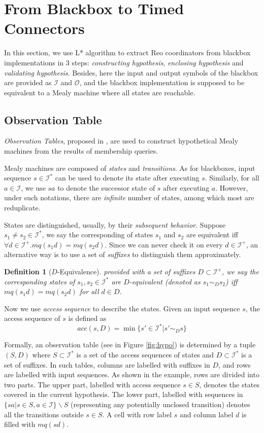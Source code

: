\documentclass[conference, a4paper]{IEEEtran}
\newtheorem{definition}{Definition}
\begin{document}
\section{From Blackbox to Timed Connectors} 
\label{sec:activelearning}
In this section, we use L* algorithm to extract Reo coordinators from blackbox
implementations in 3 steps:
\emph{constructing hypothesis}, \emph{enclosing hypothesis} and \emph{validating hypothesis}. Besides,
here the input and output symbols of the blackbox are provided as $\mathcal{I}$ and $\mathcal{O}$,
and the blackbox implementation is supposed to be equivalent to a Mealy machine where all states are
reachable.

\subsection{Observation Table}
\emph{Observation Tables}, proposed in \cite{DBLP:journals/iandc/Angluin87}, are used to construct
hypothetical Mealy machines from the results of membership queries.

Mealy machines are composed of \emph{states} and \emph{transitions}.
As for blackboxes, input sequence $s\in\mathcal{I}^*$ can be used to denote its state 
after executing $s$. Similarly, for all $a\in\mathcal{I}$, we use $sa$ to denote the successor
state of $s$ after executing $a$.
However, under such notations, there are \emph{infinite} number of states, among which most are
reduplicate.

States are distinguished, usually, by their \emph{subsequent behavior}. Suppose $s_1\neq s_2\in
\mathcal{I}^*$, we say the corresponding of states $s_1$ and $s_2$ are equivalent iff $\forall d\in
\mathcal{I}^+. mq(s_1d)=mq(s_2d)$. Since we can never check it on every $d\in\mathcal{I}^+$, an
alternative way is to use a set of \emph{suffixes} to distinguish them approximately.
\begin{definition}[$D$-Equivalence]
  provided with a set of suffixes $D\subset\mathcal{I}^+$, we say the corresponding states of
  $s_1,s_2\in\mathcal{I}^*$ are $D$-equivalent (denoted as $s_1\sim_D s_2$)
  iff $mq(s_1d) = mq(s_2d)$ for all $d\in D$.
\end{definition}

Now we use \emph{access sequence} to describe the states. Given an input sequence $s$, the access
sequence of $s$ is defined as
\[
acc(s,D)=\min\{s'\in\mathcal{I}^*|s'\sim_D s\}
\]

Formally, an observation table (see in Figure \ref{fig:hypo}) is determined by a tuple $(S,D)$ where
$S\subset\mathcal{I}^*$ is a set of the access sequences of states and $D\subset\mathcal{I}^*$
is a set of suffixes. In such tables, columns are labelled with suffixes in $D$, and rows are
labelled with input sequences. As shown in the example, rows are divided into two parts. The upper
part, labelled with access sequence $s\in S$, denotes the states covered in the current hypothesis.
The lower part, labelled with sequences in $\{sa|s\in S,a\in\mathcal{I}\}\backslash S$ (representing
any potentially unclosed transition) denotes all the transitions outside $s\in S$. A cell with row
label $s$ and column label $d$ is filled with $mq(sd)$.
\end{document}

